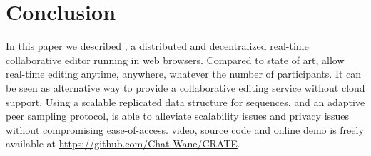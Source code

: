 
\section{Conclusion}
\label{sec:conclusion}

In this paper we described \CRATE, a distributed and decentralized
real-time collaborative editor running in web browsers. Compared to
state of art, \CRATE allow real-time editing anytime, anywhere,
whatever the number of participants. It can be seen as alternative way
to provide a collaborative editing service without cloud support. Using
a scalable replicated data structure for sequences, and an adaptive
peer sampling protocol, \CRATE is able to alleviate scalability issues
and privacy issues without compromising ease-of-access. \CRATE video,
source code and online demo is freely available at
\url{https://github.com/Chat-Wane/CRATE}.

